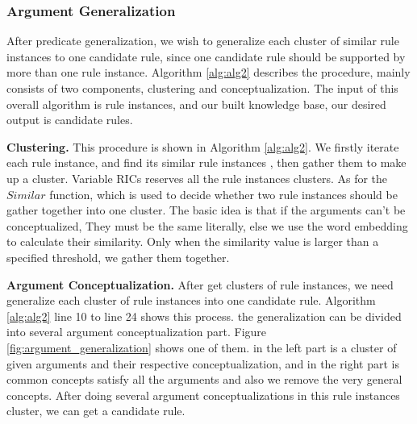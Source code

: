 \subsubsection{Argument Generalization}
After predicate generalization, we wish to generalize each cluster of similar rule instances to one candidate rule, since one candidate rule should be supported by more than one rule instance. Algorithm \ref{alg:alg2} describes the procedure, mainly consists of two components, clustering and conceptualization.
The input of this overall algorithm is rule instances, and our built knowledge base, our desired output is candidate rules.

\textbf{Clustering.} This procedure is shown in Algorithm \ref{alg:alg2}. We firstly iterate each rule instance, and find its similar rule instances , then gather them to make up a cluster. Variable RICs reserves all the rule instances clusters. As for the $Similar$ function, which is used to decide whether two rule instances should be gather together into one cluster. The basic idea is that if the arguments can't be conceptualized, They must be the same literally, else we use the word embedding to calculate their similarity. Only when the similarity value is larger than a specified threshold, we gather them together.


\textbf{Argument Conceptualization.} After get clusters of rule instances, we need generalize each cluster of rule instances into one candidate rule. Algorithm \ref{alg:alg2} line 10 to line 24 shows this process. the generalization can be divided into several argument conceptualization part. Figure \ref{fig:argument_generalization} shows one of them. in the left part is a cluster of given arguments and their respective conceptualization, and in the right part is common concepts satisfy all the arguments and also we remove the very general concepts. After doing several argument conceptualizations in this rule instances cluster, we can get a candidate rule.

